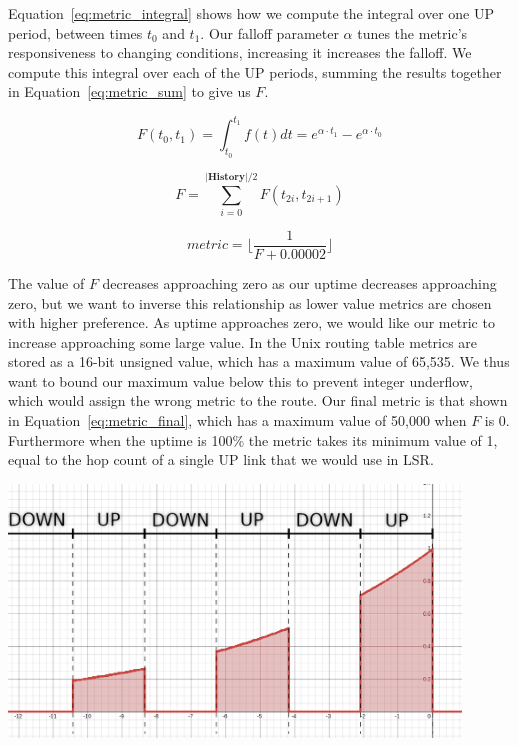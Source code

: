 \documentclass[withindex,glossary,openany]{cam-thesis}
\begin{document}
Equation~\ref{eq:metric_integral} shows how we compute the integral over one UP period, between times $t_0$ and $t_1$. Our falloff parameter $\alpha$ tunes the metric's responsiveness to changing conditions, increasing it increases the falloff. We compute this integral over each of the UP periods, summing the results together in Equation~\ref{eq:metric_sum} to give us $F$.

\begin{equation} \label{eq:metric_integral}
F(t_0, t_1) = \int_{t_0}^{t_1} f(t)dt = e^{\alpha \cdot t_1} - e^{\alpha \cdot t_0}
\end{equation}

\begin{equation} \label{eq:metric_sum}
F = \sum_{i = 0}^{|\textbf{History}|/2} F(t_{2i}, t_{2i+1})
\end{equation}

\begin{equation} \label{eq:metric_final}
\textit{metric} = \Big\lfloor\frac{1}{F+0.00002}\Big\rfloor
\end{equation}

The value of $F$ decreases approaching zero as our uptime decreases approaching zero, but we want to inverse this relationship as lower value metrics are chosen with higher preference. As uptime approaches zero, we would like our metric to increase approaching some large value. In the Unix routing table metrics are stored as a 16-bit unsigned value, which has a maximum value of 65,535. We thus want to bound our maximum value below this to prevent integer underflow, which would assign the wrong metric to the route. Our final metric is that shown in Equation~\ref{eq:metric_final}, which has a maximum value of 50,000 when $F$ is 0. Furthermore when the uptime is 100\% the metric takes its minimum value of 1, equal to the hop count of a single UP link that we would use in LSR.

\begin{center}
\begin{minipage}{0.9\textwidth} \centering
	\includegraphics[width=0.9\textwidth]{metric}
	\label{fig:metric}
\end{minipage}
\end{center}
\end{document}
